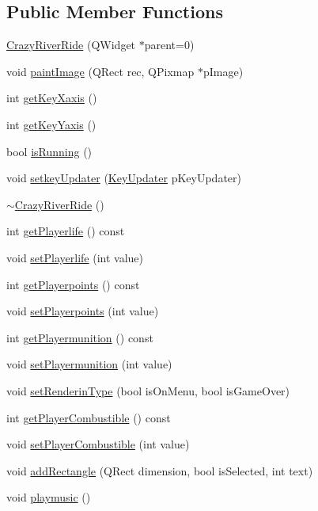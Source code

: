 \subsection*{Public Member Functions}
\begin{DoxyCompactItemize}
\item 
\hyperlink{class_crazy_river_ride_ae7676b37caf1b9f9687eb1de0b426b77}{Crazy\-River\-Ride} (Q\-Widget $\ast$parent=0)
\item 
void \hyperlink{class_crazy_river_ride_a6f69c5acd7124489c8e95024debec646}{paint\-Image} (Q\-Rect rec, Q\-Pixmap $\ast$p\-Image)
\item 
int \hyperlink{class_crazy_river_ride_a915fc6fab259b6fa24b09e64b7710e9c}{get\-Key\-Xaxis} ()
\item 
int \hyperlink{class_crazy_river_ride_a175a99b902ffc945943acc281fb28165}{get\-Key\-Yaxis} ()
\item 
bool \hyperlink{class_crazy_river_ride_ab19f0f54728bec4069aa4c20e547be3c}{is\-Running} ()
\item 
void \hyperlink{class_crazy_river_ride_a25bba6ef360d73e9bd2b43157f0eea0f}{setkey\-Updater} (\hyperlink{class_key_updater}{Key\-Updater} p\-Key\-Updater)
\item 
\hyperlink{class_crazy_river_ride_a52afd14ad1cbc9116549da20817c2cff}{$\sim$\-Crazy\-River\-Ride} ()
\item 
int \hyperlink{class_crazy_river_ride_a8e04c2ebe8c0397fada83df2bd736a80}{get\-Playerlife} () const 
\item 
void \hyperlink{class_crazy_river_ride_a6314d065ea228fd3464d41989ea56d69}{set\-Playerlife} (int value)
\item 
int \hyperlink{class_crazy_river_ride_a5c94c18d81438b715178bf4d27db79ac}{get\-Playerpoints} () const 
\item 
void \hyperlink{class_crazy_river_ride_ae422c0571f910c124ed96c680892d19b}{set\-Playerpoints} (int value)
\item 
int \hyperlink{class_crazy_river_ride_adab75d641f8df41b15851c0139b37cd3}{get\-Playermunition} () const 
\item 
void \hyperlink{class_crazy_river_ride_ae773c56d054fd73adadf6f2ab3e725e1}{set\-Playermunition} (int value)
\item 
void \hyperlink{class_crazy_river_ride_a33d1c49da5c75f486a5a6cf468ea194d}{set\-Renderin\-Type} (bool is\-On\-Menu, bool is\-Game\-Over)
\item 
int \hyperlink{class_crazy_river_ride_a7ff417550948dd28d538e614fd23d91b}{get\-Player\-Combustible} () const 
\item 
void \hyperlink{class_crazy_river_ride_ab9d581ecdc75251102d8c243d47fbe00}{set\-Player\-Combustible} (int value)
\item 
void \hyperlink{class_crazy_river_ride_aca6033fd6c0387fb97e48bd7ca9a1161}{add\-Rectangle} (Q\-Rect dimension, bool is\-Selected, int text)
\item 
void \hyperlink{class_crazy_river_ride_a48c19baeb07b2e81d2663adc70ede714}{playmusic} ()
\end{DoxyCompactItemize}
